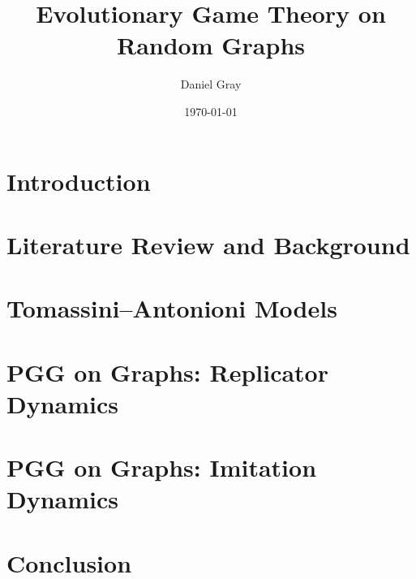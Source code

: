 \documentclass[12pt,twoside]{report}
\title{Evolutionary Game Theory on Random Graphs}
\author{Daniel Gray}
\date{\today}
\begin{document}







\tableofcontents



\chapter{Introduction} \label{Chapter:Intro}
%
\chapter{Literature Review and Background} \label{Chapter:Lit}
%
\chapter{Tomassini--Antonioni Models} \label{TA}
%

\chapter{PGG on Graphs: Replicator Dynamics} 
\label{Chapter:Rep}

\chapter{PGG on Graphs: Imitation Dynamics} 
\label{Chapter:ID}
%


\chapter{Conclusion} \label{Conclusion}
%

%

\end{document}
